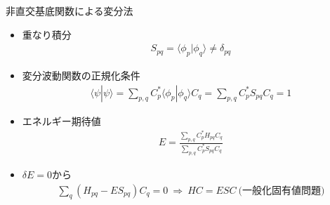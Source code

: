 
\begin{frame}[t,fragile]{非直交基底関数による変分法}
  \begin{itemize}
  \item 重なり積分
    \begin{align*}
      S_{pq} = \langle \phi_p | \phi_q \rangle \ne \delta_{pq}
    \end{align*}
  \item 変分波動関数の正規化条件
    \begin{align*}
      \langle \psi | \psi \rangle = \sum_{p,q} C_p^* \langle \phi_p | \phi_q \rangle C_q = \sum_{p,q} C_p^* S_{pq} C_q = 1
    \end{align*}
  \item エネルギー期待値
    \begin{align*}
      E = \frac{\sum_{p,q} C_p^* H_{pq} C_q}{\sum_{p,q} C_p^* S_{pq} C_q}
    \end{align*}
  \item $\delta E = 0$から
    \begin{align*}
      \sum_q (H_{pq} - E S_{pq}) C_q = 0 \ \Rightarrow \ HC = ESC \ \text{(一般化固有値問題)}
    \end{align*}
  \end{itemize}
\end{frame}
